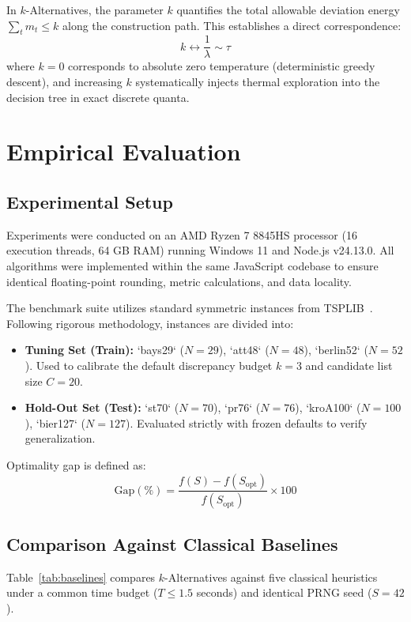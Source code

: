 \documentclass[11pt,a4paper]{article}
\begin{document}
In $k$-Alternatives, the parameter $k$ quantifies the total allowable deviation energy $\sum_t m_t \le k$ along the construction path. This establishes a direct correspondence:
\begin{equation}
    k \longleftrightarrow \frac{1}{\lambda} \sim \tau
\end{equation}
where $k=0$ corresponds to absolute zero temperature (deterministic greedy descent), and increasing $k$ systematically injects thermal exploration into the decision tree in exact discrete quanta.

\section{Empirical Evaluation}
\label{sec:eval}

\subsection{Experimental Setup}
Experiments were conducted on an AMD Ryzen 7 8845HS processor (16 execution threads, 64 GB RAM) running Windows 11 and Node.js v24.13.0. All algorithms were implemented within the same JavaScript codebase to ensure identical floating-point rounding, metric calculations, and data locality.

The benchmark suite utilizes standard symmetric instances from TSPLIB~\citep{reinelt1991tsplib}. Following rigorous methodology, instances are divided into:
\begin{itemize}
    \item \textbf{Tuning Set (Train):} `bays29` ($N=29$), `att48` ($N=48$), `berlin52` ($N=52$). Used to calibrate the default discrepancy budget $k=3$ and candidate list size $C=20$.
    \item \textbf{Hold-Out Set (Test):} `st70` ($N=70$), `pr76` ($N=76$), `kroA100` ($N=100$), `bier127` ($N=127$). Evaluated strictly with frozen defaults to verify generalization.
\end{itemize}

Optimality gap is defined as:
\begin{equation}
    \text{Gap}(\%) = \frac{f(S) - f(S_{\text{opt}})}{f(S_{\text{opt}})} \times 100
\end{equation}

\subsection{Comparison Against Classical Baselines}
Table~\ref{tab:baselines} compares $k$-Alternatives against five classical heuristics under a common time budget ($T \le 1.5$ seconds) and identical PRNG seed ($S=42$).
\end{document}
